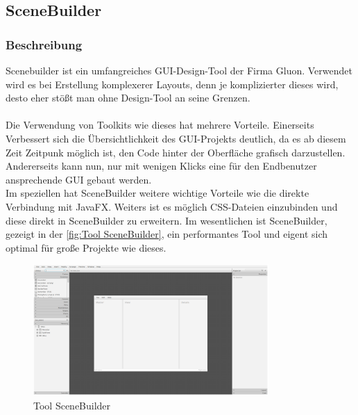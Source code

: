 \subsection{SceneBuilder}\label{subsec:scenebuilder}
\subsubsection{Beschreibung}
Scenebuilder ist ein umfangreiches GUI-Design-Tool der Firma Gluon.
Verwendet wird es bei Erstellung komplexerer Layouts, denn je komplizierter dieses wird, desto eher stößt man ohne Design-Tool an seine Grenzen.\\\\
Die Verwendung von Toolkits wie dieses hat mehrere Vorteile.
Einerseits Verbessert sich die Übersichtlichkeit des GUI-Projekts deutlich, da es ab diesem Zeit Zeitpunk möglich ist, den Code hinter der Oberfläche grafisch darzustellen.
Andererseits kann nun, nur mit wenigen Klicks eine für den Endbenutzer ansprechende GUI gebaut werden.\\
Im speziellen hat SceneBuilder weitere wichtige Vorteile wie die direkte Verbindung mit JavaFX.
Weiters ist es möglich CSS-Dateien einzubinden und diese direkt in SceneBuilder zu erweitern.
Im wesentlichen ist SceneBuilder, gezeigt in der \autoref{fig:Tool SceneBuilder}, ein performantes Tool und eigent sich optimal für große Projekte wie dieses.
\begin{figure}[htb!]
    \centering
    \includegraphics[width=0.8\textwidth]{fig/ainf/SceneBuilder.png}
    \caption{Tool SceneBuilder}
    \label{fig:Tool SceneBuilder}
\end{figure}
